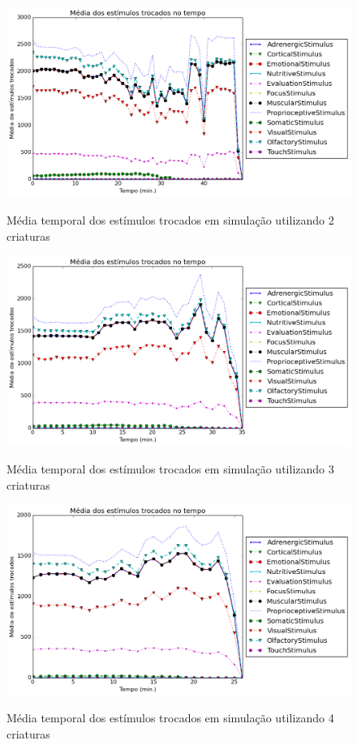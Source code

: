 \begin{figure}[H]
  \centering
  \caption{Média temporal dos estímulos trocados em simulação utilizando 2 criaturas}
  \includegraphics[scale=0.6]{04-figuras/experiments/exp_2/2/avgExchangedStimuliOverTime.png} 
  \label{fig:exp_2_2_exchgStimuli}
\end{figure}

\begin{figure}[H]
  \centering
  \caption{Média temporal dos estímulos trocados em simulação utilizando 3 criaturas}
  \includegraphics[scale=0.6]{04-figuras/experiments/exp_2/3/avgExchangedStimuliOverTime.png}
  \label{fig:exp_2_3_exchgStimuli}
\end{figure}

\begin{figure}[H]
  \centering
  \caption{Média temporal dos estímulos trocados em simulação utilizando 4 criaturas}
  \includegraphics[scale=0.6]{04-figuras/experiments/exp_2/4/avgExchangedStimuliOverTime.png}
  \label{fig:exp_2_4_exchgStimuli}
\end{figure}

